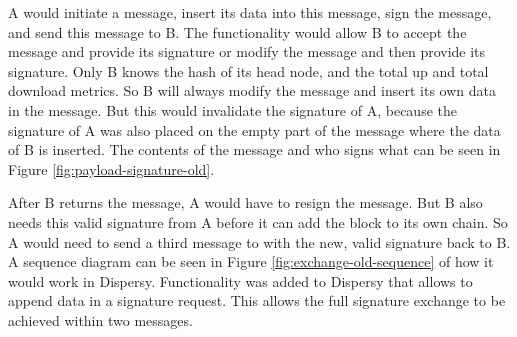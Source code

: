 A would initiate a message, insert its data into this message, sign the message, and send this message to B.
The functionality would allow B to accept the message and provide its signature or
modify the message and then provide its signature.
Only B knows the hash of its head node, and the total up and total download metrics.
So B will always modify the message and insert its own data in the message.
But this would invalidate the signature of A,
because the signature of A was also placed on the empty part of the message where the data of B is inserted.
The contents of the message and who signs what can be seen in Figure \ref{fig:payload-signature-old}.

After B returns the message,
A would have to resign the message.
But B also needs this valid signature from A before it can add the block to its own chain.
So A would need to send a third message to with the new, valid signature back to B.
A sequence diagram can be seen in Figure \ref{fig:exchange-old-sequence} of how it would work in Dispersy.
Functionality was added to Dispersy that allows to append data in a signature request.
This allows the full signature exchange to be achieved within two messages.